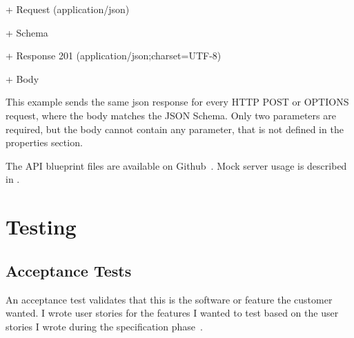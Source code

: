 + Request (application/json)
\begin{addmargin}[1em]{1em}
	+ Schema
		\begin{addmargin}[1em]{1em}
		\end{addmargin}
\end{addmargin}

+ Response 201 (application/json;charset=UTF-8)
\begin{addmargin}[1em]{1em}
	+ Body
	\begin{addmargin}[1em]{1em}
	\end{addmargin}
\end{addmargin}
	
This example sends the same json response for every HTTP POST or OPTIONS request, where the body matches the JSON Schema. Only two parameters are required, but the body cannot contain any parameter, that is not defined in the properties section.

The API blueprint files are available on Github~\cite{Github-blueprint}. Mock server usage is described in .


\section{Testing}
\subsection{Acceptance Tests}
An acceptance test validates that this is the software or feature the customer wanted. I wrote user stories  for the features I wanted to test based on the user stories I wrote during the specification phase~\cite{szofttech}.

